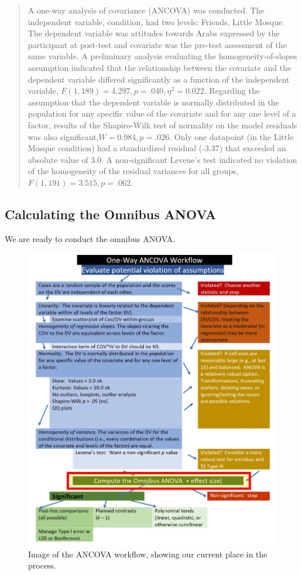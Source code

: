 \documentclass[
  11pt,
]{book}
\begin{document}
\begin{quote}
A one-way analysis of covariance (ANCOVA) was conducted. The independent variable, condition, had two levels: Friends, Little Mosque. The dependent variable was attitudes towards Arabs expressed by the participant at post-test and covariate was the pre-test assessment of the same variable. A preliminary analysis evaluating the homogeneity-of-slopes assumption indicated that the relationship between the covariate and the dependent variable differed significantly as a function of the independent variable, \(F (1, 189) = 4.297, p = .040, \eta^2 = 0.022\). Regarding the assumption that the dependent variable is normally distributed in the population for any specific value of the covariate and for any one level of a factor, results of the Shapiro-Wilk test of normality on the model residuals was also significant,\(W = 0.984, p = .026\). Only one datapoint (in the Little Mosque condition) had a standardized residual (-3.37) that exceeded an absolute value of 3.0. A non-significant Levene's test indicated no violation of the homogeneity of the residual variances for all groups, \(F(1, 191) = 3.515, p = .062\).
\end{quote}

\hypertarget{calculating-the-omnibus-anova}{%
\subsection{Calculating the Omnibus ANOVA}\label{calculating-the-omnibus-anova}}

We are ready to conduct the omnibus ANOVA.

\begin{figure}
\centering
\includegraphics{images/ANCOVA/wf_ANCOVA_omnibus.jpg}
\caption{Image of the ANCOVA workflow, showing our current place in the process.}
\end{figure}
\end{document}

